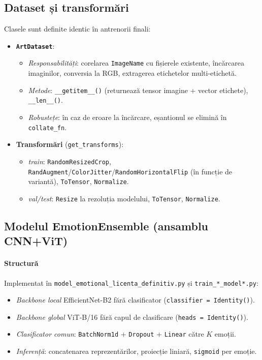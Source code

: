 \subsection{Dataset și transformări}
Clasele sunt definite identic în antrenorii finali:
\begin{itemize}
  \item \textbf{\texttt{ArtDataset}}:
\begin{itemize}
      \item \emph{Responsabilități}: corelarea \texttt{ImageName} cu fișierele existente, încărcarea imaginilor, conversia la RGB, extragerea etichetelor multi-etichetă.
      \item \emph{Metode}: \texttt{\_\_getitem\_\_()} (returnează tensor imagine + vector etichete), \texttt{\_\_len\_\_()}.
      \item \emph{Robustețe}: în caz de eroare la încărcare, eșantionul se elimină în \texttt{collate\_fn}.
    \end{itemize}
  \item \textbf{Transformări} (\texttt{get\_transforms}):
\begin{itemize}
      \item \emph{train}: \texttt{RandomResizedCrop}, \texttt{RandAugment}/\texttt{ColorJitter}/\texttt{RandomHorizontalFlip} (în funcție de variantă), \texttt{ToTensor}, \texttt{Normalize}.
      \item \emph{val/test}: \texttt{Resize} la rezoluția modelului, \texttt{ToTensor}, \texttt{Normalize}.
    \end{itemize}
\end{itemize}

\subsection{Modelul EmotionEnsemble (ansamblu CNN+ViT)}
\paragraph{Structură}
Implementat în \texttt{model\_emotional\_licenta\_definitiv.py} și \texttt{train\_*\_model*.py}:
\begin{itemize}
  \item \emph{Backbone local} EfficientNet-B2 fără clasificator (\texttt{classifier = Identity()}).
  \item \emph{Backbone global} ViT-B/16 fără capul de clasificare (\texttt{heads = Identity()}).
  \item \emph{Clasificator comun}: \texttt{BatchNorm1d} + \texttt{Dropout} + \texttt{Linear} către $K$ emoții.
  \item \emph{Inferență}: concatenarea reprezentărilor, proiecție liniară, \texttt{sigmoid} per emoție.
\end{itemize}

